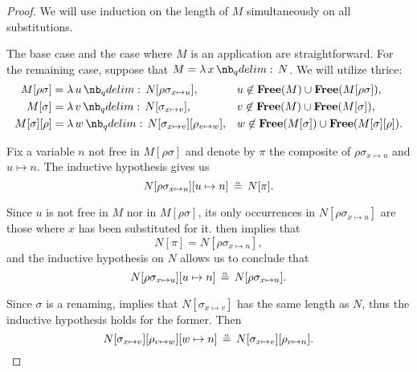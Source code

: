 \begin{proof}
  We will use induction on the length of \( M \) simultaneously on all substitutions.

  The base case and the case where \( M \) is an application are straightforward. For the remaining case, suppose that \( M = \qabs x N \). We will utilize  thrice:
  \begin{align*}
    M[\rho\sigma]   &= \qabs u N[\rho\sigma_{x \mapsto u}],                 &&u \not\in \op*{Free}(M) \cup \op*{Free}(M[\rho\sigma]), \\
    M[\sigma]       &= \qabs v N[\sigma_{x \mapsto v}],                     &&v \not\in \op*{Free}(M) \cup \op*{Free}(M[\sigma]), \\
    M[\sigma][\rho] &= \qabs w N[\sigma_{x \mapsto v}][\rho_{v \mapsto w}], &&w \not\in \op*{Free}(M[\sigma]) \cup \op*{Free}(M[\sigma][\rho]).
  \end{align*}

  Fix a variable \( n \) not free in \( M[\rho\sigma] \) and denote by \( \pi \) the composite of \( \rho\sigma_{x \mapsto u} \) and \( u \mapsto n \). The inductive hypothesis gives us
  \begin{equation*}
    N[\rho\sigma_{x \mapsto u}][u \mapsto n] \aequiv N[\pi].
  \end{equation*}

  Since \( u \) is not free in \( M \) nor in \( M[\rho\sigma] \), its only occurrences in \( N[\rho\sigma_{x \mapsto u}] \) are those where \( x \) has been substituted for it.  then implies that
  \begin{equation*}
    N[\pi] = N[\rho\sigma_{x \mapsto n}],
  \end{equation*}
  and the inductive hypothesis on \( N \) allows us to conclude that
  \begin{equation}\label{eq:thm:renaming_composition_is_alpha_equivalent/proof/composite}
    N[\rho\sigma_{x \mapsto u}][u \mapsto n] \aequiv N[\rho\sigma_{x \mapsto n}].
  \end{equation}

  Since \( \sigma \) is a renaming,  implies that \( N[\sigma_{x \mapsto v}] \) has the same length as \( N \), thus the inductive hypothesis holds for the former. Then
  \begin{equation*}
    N[\sigma_{x \mapsto v}][\rho_{v \mapsto w}][w \mapsto n] \aequiv N[\sigma_{x \mapsto v}][\rho_{v \mapsto n}].
  \end{equation*}


\end{proof}
